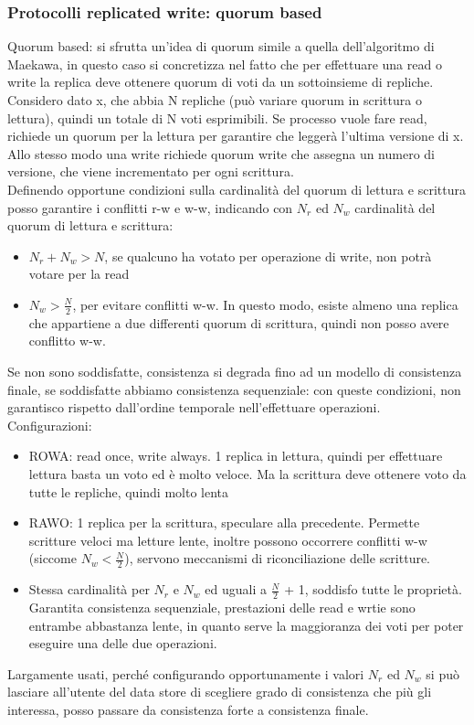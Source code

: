 \documentclass{article}
\begin{document}
\subsubsection{Protocolli replicated write: quorum based}
Quorum based: si sfrutta un'idea di quorum simile a quella dell'algoritmo di Maekawa, in questo caso si concretizza nel fatto che per effettuare una read o write la replica deve ottenere quorum di voti da un sottoinsieme di repliche.\\ Considero dato x, che abbia N repliche (può variare quorum in scrittura o lettura), quindi un totale di N voti esprimibili. Se processo vuole fare read, richiede un quorum per la lettura per garantire che leggerà l'ultima versione di x. Allo stesso modo una write richiede quorum write che assegna un numero di versione, che viene incrementato per ogni scrittura.\\ Definendo opportune condizioni sulla cardinalità del quorum di lettura e scrittura posso garantire i conflitti r-w e w-w, indicando con $N_r$ ed $N_w$ cardinalità del quorum di lettura e scrittura:
\begin{itemize}
\item $N_r + N_w > N$, se qualcuno ha votato per operazione di write, non potrà votare per la read
\item $N_w > \frac{N}{2}$, per evitare conflitti w-w. In questo modo, esiste almeno una replica che appartiene a due differenti quorum di scrittura, quindi non posso avere conflitto w-w.
\end{itemize}
Se non sono soddisfatte, consistenza si degrada fino ad un modello di consistenza finale, se soddisfatte abbiamo consistenza sequenziale: con queste condizioni, non garantisco rispetto dall'ordine temporale nell'effettuare operazioni.\\ Configurazioni:
\begin{itemize}
\item ROWA: read once, write always. 1 replica in lettura, quindi per effettuare lettura basta un voto ed è molto veloce. Ma la scrittura deve ottenere voto da tutte le repliche, quindi molto lenta
\item RAWO: 1 replica per la scrittura, speculare alla precedente. Permette scritture veloci ma letture lente, inoltre possono occorrere conflitti w-w (siccome $N_w < \frac{N}{2}$), servono meccanismi di riconciliazione delle scritture.
\item Stessa cardinalità per $N_r$ e $N_w$ ed uguali a $\frac{N}{2}$ + 1, soddisfo tutte le proprietà. Garantita consistenza sequenziale, prestazioni delle read e wrtie sono entrambe abbastanza lente, in quanto serve la maggioranza dei voti per poter eseguire una delle due operazioni.
\end{itemize}
Largamente usati, perché configurando opportunamente i valori $N_r$ ed $N_w$ si può lasciare all'utente del data store di scegliere grado di consistenza che più gli interessa, posso passare da consistenza forte a consistenza finale.
\end{document}
